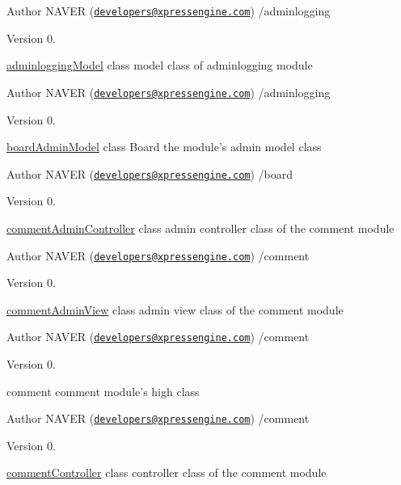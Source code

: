 \begin{DoxyAuthor}{Author}
N\+A\+V\+E\+R (\href{mailto:developers@xpressengine.com}{\tt developers@xpressengine.\+com}) /adminlogging 
\end{DoxyAuthor}
\begin{DoxyVersion}{Version}
0.
\end{DoxyVersion}
\hyperlink{classadminloggingModel}{adminlogging\+Model} class model class of adminlogging module

\begin{DoxyAuthor}{Author}
N\+A\+V\+E\+R (\href{mailto:developers@xpressengine.com}{\tt developers@xpressengine.\+com}) /adminlogging 
\end{DoxyAuthor}
\begin{DoxyVersion}{Version}
0.
\end{DoxyVersion}
\hyperlink{classboardAdminModel}{board\+Admin\+Model} class Board the module's admin model class

\begin{DoxyAuthor}{Author}
N\+A\+V\+E\+R (\href{mailto:developers@xpressengine.com}{\tt developers@xpressengine.\+com}) /board 
\end{DoxyAuthor}
\begin{DoxyVersion}{Version}
0.
\end{DoxyVersion}
\hyperlink{classcommentAdminController}{comment\+Admin\+Controller} class admin controller class of the comment module

\begin{DoxyAuthor}{Author}
N\+A\+V\+E\+R (\href{mailto:developers@xpressengine.com}{\tt developers@xpressengine.\+com}) /comment 
\end{DoxyAuthor}
\begin{DoxyVersion}{Version}
0.
\end{DoxyVersion}
\hyperlink{classcommentAdminView}{comment\+Admin\+View} class admin view class of the comment module

\begin{DoxyAuthor}{Author}
N\+A\+V\+E\+R (\href{mailto:developers@xpressengine.com}{\tt developers@xpressengine.\+com}) /comment 
\end{DoxyAuthor}
\begin{DoxyVersion}{Version}
0.
\end{DoxyVersion}
comment comment module's high class

\begin{DoxyAuthor}{Author}
N\+A\+V\+E\+R (\href{mailto:developers@xpressengine.com}{\tt developers@xpressengine.\+com}) /comment 
\end{DoxyAuthor}
\begin{DoxyVersion}{Version}
0.
\end{DoxyVersion}
\hyperlink{classcommentController}{comment\+Controller} class controller class of the comment module

